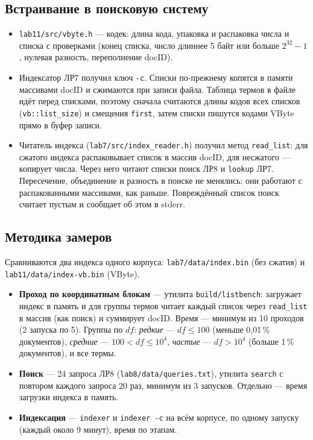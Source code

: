 \subsection{Встраивание в поисковую систему}
\begin{itemize}
    \item \texttt{lab11/src/vbyte.h} --- кодек: длина кода, упаковка и распаковка числа и списка с проверками (конец списка, число длиннее 5 байт или больше $2^{32} - 1$, нулевая разность, переполнение docID).
    \item Индексатор ЛР7 получил ключ \texttt{-c}. Списки по-прежнему копятся в памяти массивами docID и сжимаются при записи файла. Таблица термов в файле идёт перед списками, поэтому сначала считаются длины кодов всех списков (\texttt{vb::list\_size}) и смещения \texttt{first}, затем списки пишутся кодами VByte прямо в буфер записи.
    \item Читатель индекса (\texttt{lab7/src/index\_reader.h}) получил метод \texttt{read\_list}: для сжатого индекса распаковывает список в массив docID, для несжатого --- копирует числа. Через него читают списки поиск ЛР8 и \texttt{lookup} ЛР7. Пересечение, объединение и разность в поиске не менялись: они работают с распакованными массивами, как раньше. Повреждённый список поиск считает пустым и сообщает об этом в stderr.
\end{itemize}

\subsection{Методика замеров}
Сравниваются два индекса одного корпуса: \texttt{lab7/data/index.bin} (без сжатия) и \texttt{lab11/data/index-vb.bin} (VByte).
\begin{itemize}
    \item \textbf{Проход по координатным блокам} --- утилита \texttt{build/listbench}: загружает индекс в память и для группы термов читает каждый список через \texttt{read\_list} в массив (как поиск) и суммирует docID. Время --- минимум из 10 проходов (2 запуска по 5). Группы по $df$: \emph{редкие} --- $df \le 100$ (меньше 0,01\,\% документов), \emph{средние} --- $100 < df \le 10^4$, \emph{частые} --- $df > 10^4$ (больше 1\,\% документов), и все термы.
    \item \textbf{Поиск} --- 24 запроса ЛР8 (\texttt{lab8/data/queries.txt}), утилита \texttt{search} с повтором каждого запроса 20 раз, минимум из 3 запусков. Отдельно --- время загрузки индекса в память.
    \item \textbf{Индексация} --- \texttt{indexer} и \texttt{indexer -c} на всём корпусе, по одному запуску (каждый около 9 минут), время по этапам.
\end{itemize}
